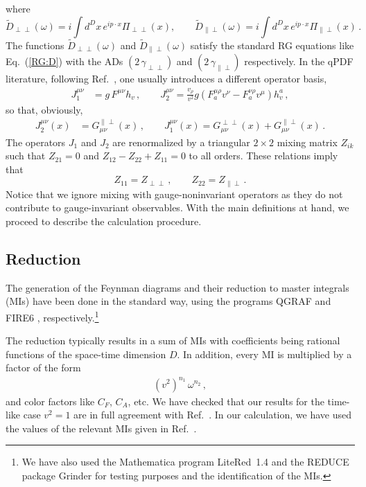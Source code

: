 \documentclass[12pt]{article}
\numberwithin{equation}{section}
\newcommand{\1}[1]{\mathbf{1}^{#1}}
\newcommand{\2}[1]{\mathbf{2}^{#1}}
\newcommand{\3}[1]{\mathbf{3}^{#1}}
\newcommand{\4}[1]{\mathbf{4}^{#1}}
\newcommand{\5}[1]{\mathbf{5}^{#1}}
\newcommand{\tD}{\tilde{D}}
\newcommand{\mlabel}[1]{ \text{\footnotesize \hspace{3mm}\fbox{\fbox{$#1$}} \label{#1}}}
\renewcommand{\mlabel}[1]{\label{#1}}
\newcommand{\beq}{\begin{equation}}
\newcommand{\eeq}{\end{equation}}
\newcommand{\re}[1]{(\ref{#1})}
\newcommand{\ga}{\gamma}
\newcommand{\om}{\omega}
\newcommand{\vv}{v^2}
\newcommand{\TT}{{\perp\perp}}
\newcommand{\PT}{{\parallel\perp}}
\begin{document}
where
\beq
  \widetilde{D}_{\perp\perp}(\om)   =  i\int\!d^D x \, e^{ip\cdot x} \Pi_{\perp\perp}(x),\qquad
\widetilde{D}_{\parallel\perp}(\om)  =  i\int\!d^D x \, e^{ip\cdot x} \Pi_{\parallel\perp}(x)\,.
\mlabel{mom:Pitt+pt)}
\eeq
The functions $\tD_\TT(\om)$ and $\tD_\PT(\om)$ satisfy the standard RG
equations like Eq.~\re{RG:D} with the ADs $(2\,\ga_\TT)$ and
$(2\, \ga_\PT)$ respectively.
In the qPDF literature, following Ref.~\cite{Dorn:1980hs,Dorn:1981wa}, 
one usually introduces a different operator basis,
\begin{align}
J_1^{\mu\nu} &= g\,F^{\mu\nu}h_v\,, \qquad
J_2^{\mu\nu} = \frac{v_\rho}{v^2} g \left(
  F^{\mu\rho}_a v^\nu -  F^{\nu\rho}_a v^\mu
\right) h_v^a\,,
\end{align}
so that, obviously,
\begin{align}
  J_2^{\mu\nu}(x) &= G^{\parallel\perp}_{\mu\nu} (x)\,,
\qquad
  J_1^{\mu\nu}(x) =  G^{\perp\perp}_{\mu\nu}(x) +  G^{\parallel\perp}_{\mu\nu}(x)\,. 
\end{align}
The operators $J_1$ and $J_2$ are renormalized by a triangular $2\times2$ mixing matrix $Z_{ik}$ such 
that $Z_{21}=0$ and $Z_{12} - Z_{22}+ Z_{11} = 0$ to all orders. 
These relations imply that
\beq
Z_{11} =  Z_{\perp\perp}\,,\qquad
Z_{22} =  Z_{\parallel\perp}\,.
\eeq
Notice that we ignore mixing with gauge-noninvariant operators as they do not
contribute to gauge-invariant observables.
With the main definitions at hand, we proceed to describe the calculation procedure.

\subsection{Reduction}

The generation of the Feynman diagrams and their reduction to master integrals (MIs)
have been done in the  standard way, using the programs
QGRAF \cite{QGRAF} and FIRE6 \cite{Smirnov:2019qkx}, respectively.\footnote{We have also used
  the Mathematica  program LiteRed~1.4  \cite{Lee:2012cn,Lee:2013mka}  and  the REDUCE package Grinder
  \cite{Grozin:2000jv}  for testing purposes and the identification of the MIs.} 
  
The reduction typically results in a sum of MIs with coefficients being  
rational functions of the space-time dimension $D$. In addition, every MI is multiplied 
by a factor of the form 
\begin{align}
(\vv)^{n_1}\, \omega^{n_2}\,,
\mlabel{fctr}
\end{align}
and color factors like $C_F$, $C_A$, etc. 
We have checked that our results for the time-like  case $\vv = 1$
are in full agreement with Ref.~\cite{Chetyrkin:2003vi}.
In our calculation, we have used the values of the relevant MIs given in
Ref.~\cite{Chetyrkin:2003vi}.
\end{document}
